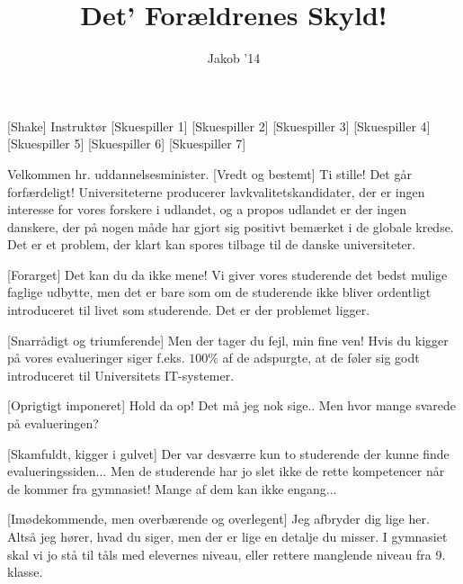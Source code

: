 \documentclass[a4paper,11pt]{article}
\title{Det' Forældrenes Skyld!}
\author{Jakob '14}
\begin{document}
\maketitle

\begin{roles}
[Shake] Instruktør
[Skuespiller 1]
[Skuespiller 2]
[Skuespiller 3]
[Skuespiller 4]
[Skuespiller 5]
[Skuespiller 6]
[Skuespiller 7]
\end{roles}



\begin{sketch}

 Velkommen hr. uddannelsesminister.
[Vredt og bestemt] Ti stille! Det går forfærdeligt! Universiteterne producerer lavkvalitetskandidater, der er ingen interesse for vores forskere i udlandet, og a propos udlandet er der ingen danskere, der på nogen måde har gjort sig positivt bemærket i de globale kredse. Det er et problem, der klart kan spores tilbage til de danske universiteter. 

[Forarget] Det kan du da ikke mene! Vi giver vores studerende det bedst mulige faglige udbytte, men det er bare som om de studerende ikke bliver ordentligt introduceret til livet som studerende. Det er der problemet ligger. 

[Snarrådigt og triumferende] Men der tager du fejl, min fine ven! Hvis du kigger på vores evalueringer siger f.eks. $100\%$ af de adspurgte, at de føler sig godt introduceret til Universitets IT-systemer.

[Oprigtigt imponeret] Hold da op! Det må jeg nok sige..  Men hvor mange svarede på evalueringen?

[Skamfuldt, kigger i gulvet] Der var desværre kun to studerende der kunne finde evalueringssiden...  Men de studerende har jo slet ikke de rette kompetencer når de kommer fra gymnasiet! Mange af dem kan ikke engang... 

[Imødekommende, men overbærende og overlegent] Jeg afbryder dig lige her. Altså jeg hører, hvad du siger, men der er lige en detalje du misser. I gymnasiet skal vi jo stå til tåls med elevernes niveau, eller rettere manglende niveau fra 9. klasse. 


\end{sketch}
\end{document}
